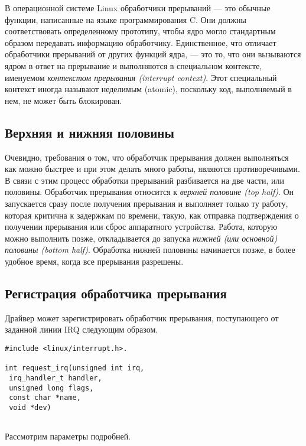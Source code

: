 В операционной системе Linux обработчики прерываний — это обычные функции, написанные на языке программирования C. Они должны соответствовать определенному
прототипу, чтобы ядро могло стандартным образом передавать информацию обработчику. Единственное, что отличает обработчики прерываний от других функций ядра, — это то, что они вызываются ядром в ответ на прерывание и выполняются в специальном контексте, именуемом \textit{контекстом прерывания (interrupt context)}. Этот специальный контекст иногда называют неделимым (atomic), поскольку код, выполняемый в нем, не может быть блокирован.

\subsection{Верхняя и нижняя половины}
Очевидно, требования о том, что обработчик прерывания должен выполняться как можно быстрее и при этом делать много работы, являются противоречивыми. В связи с этим процесс обработки прерываний разбивается на две части,
или половины. Обработчик прерывания относится к \textit{верхней половине (top half)}. Он запускается сразу после получения прерывания и выполняет только ту работу, которая критична к задержкам по времени, такую, как отправка подтверждения о получении прерывания или сброс аппаратного устройства. Работа, которую можно выполнить позже, откладывается до запуска \textit{нижней (или основной) половины (bottom half)}. Обработка нижней половины начинается позже, в более удобное время, когда все прерывания разрешены.

\subsection{Регистрация обработчика прерывания}
Драйвер может зарегистрировать обработчик прерывания, поступающего от заданной
линии IRQ следующим образом.

\begin{lstlisting}
#include <linux/interrupt.h>.

int request_irq(unsigned int irq,
 irq_handler_t handler,
 unsigned long flags,
 const char *name,
 void *dev)
 
\end{lstlisting}

Рассмотрим параметры подробней.

